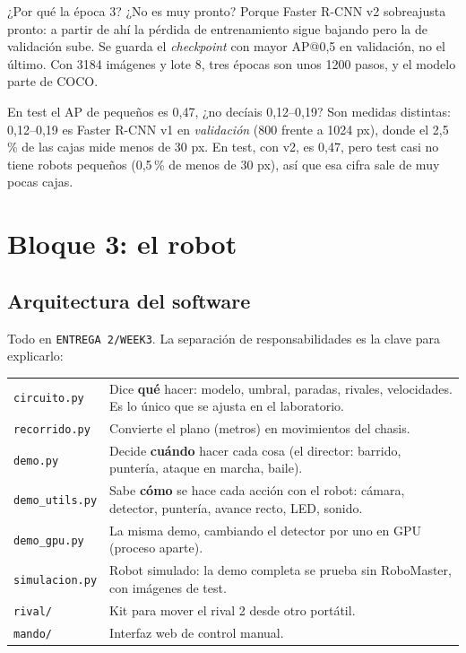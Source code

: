 \documentclass[11pt,a4paper]{article}
\newcommand{\cod}[1]{\texttt{#1}}
\begin{document}
\begin{pregunta}{¿Por qué la época 3? ¿No es muy pronto?}
Porque Faster R-CNN v2 sobreajusta pronto: a partir de ahí la pérdida de entrenamiento sigue bajando pero la de validación sube. Se guarda el \emph{checkpoint} con mayor AP@0,5 en validación, no el último. Con 3184 imágenes y lote 8, tres épocas son unos 1200 pasos, y el modelo parte de COCO.
\end{pregunta}

\begin{pregunta}{En test el AP de pequeños es 0,47, ¿no decíais 0,12--0,19?}
Son medidas distintas: 0,12--0,19 es Faster R-CNN v1 en \emph{validación} (800 frente a 1024 px), donde el 2,5\,\% de las cajas mide menos de 30 px. En test, con v2, es 0,47, pero test casi no tiene robots pequeños (0,5\,\% de menos de 30 px), así que esa cifra sale de muy pocas cajas.
\end{pregunta}

\newpage
\section{Bloque 3: el robot}\label{sec:bloque3}

\subsection{Arquitectura del software}
Todo en \cod{ENTREGA 2/\allowbreak{}WEEK3}. La separación de responsabilidades es la clave para explicarlo:

\begin{center}
\begin{tabular}{@{}lp{10.5cm}@{}}
\toprule
\cod{circuito.py} & Dice \textbf{qué} hacer: modelo, umbral, paradas, rivales, velocidades. Es lo único que se ajusta en el laboratorio. \\
\cod{recorrido.py} & Convierte el plano (metros) en movimientos del chasis. \\
\cod{demo.py} & Decide \textbf{cuándo} hacer cada cosa (el director: barrido, puntería, ataque en marcha, baile). \\
\cod{demo\_\allowbreak{}utils.py} & Sabe \textbf{cómo} se hace cada acción con el robot: cámara, detector, puntería, avance recto, LED, sonido. \\
\cod{demo\_\allowbreak{}gpu.py} & La misma demo, cambiando el detector por uno en GPU (proceso aparte). \\
\cod{simulacion.py} & Robot simulado: la demo completa se prueba sin RoboMaster, con imágenes de test. \\
\cod{rival/\allowbreak{}} & Kit para mover el rival 2 desde otro portátil. \\
\cod{mando/\allowbreak{}} & Interfaz web de control manual. \\
\bottomrule
\end{tabular}
\end{center}
\end{document}
